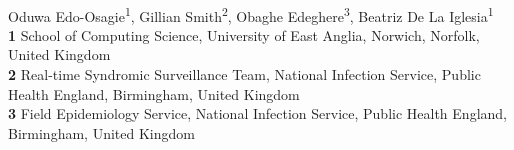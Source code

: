\documentclass[10pt,letterpaper]{article}
\date{}
\author{[AUTHORS]}
\begin{document}
\vspace*{0.2in}
\begin{flushleft}
	{\Large
		\textbf{} %
	}
	\newline
	\\
	Oduwa Edo-Osagie\textsuperscript{1},
	Gillian Smith\textsuperscript{2},
	Obaghe Edeghere\textsuperscript{3},
	Beatriz De La Iglesia\textsuperscript{1}
	\\
	\bigskip
	\textbf{1} School of Computing Science, University of East Anglia, Norwich, Norfolk, United Kingdom
	\\
	\textbf{2} Real-time Syndromic Surveillance Team, National Infection Service, Public Health England, Birmingham, United Kingdom
	\\
	\textbf{3} Field Epidemiology Service, National Infection Service, Public Health England, Birmingham, United Kingdom
	\\
	\bigskip
\end{flushleft}

\end{document}
